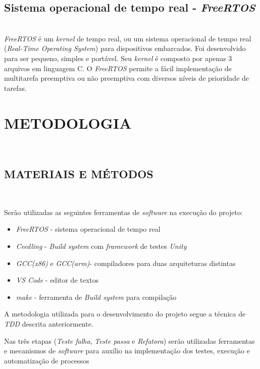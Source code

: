 \documentclass[times, twoside, watermark]{artigo}
\begin{document}
\subsection{Sistema operacional de tempo real - \textit{FreeRTOS}}\hfill\\

\textit{FreeRTOS} é um \textit{kernel} de tempo real, 
ou um sistema operacional de tempo real (\textit{Real-Time Operating System}) 
para dispositivos embarcados. Foi desenvolvido para ser pequeno, simples e portável. 
Seu \textit{kernel} é composto por apenas 3 arquivos em linguagem C. 
O \textit{FreeRTOS} permite a fácil implementação de multitarefa preemptiva 
ou não preemptiva com diversos níveis de prioridade de 
tarefas\cite{zhu2016understanding}.\hfill\\


\section{METODOLOGIA}\hfill\

\subsection{MATERIAIS E MÉTODOS}\hfill\

Serão utilizadas as seguintes ferramentas de \textit{software} na execução do projeto:

\begin{itemize}
\item \textit{FreeRTOS} - sistema operacional de tempo real
\item \textit{Ceedling} - \textit{Build system} com \textit{framework} de testes \textit{Unity}
\item \textit{GCC(x86)} e \textit{GCC(arm)}- compiladores para duas arquiteturas distintas
\item \textit{VS Code} - editor de textos
\item \textit{make} - ferramenta de \textit{Build system} para compilação
\end{itemize}

A metodologia utilizada para o desenvolvimento do projeto segue a técnica de \textit{TDD} descrita anteriormente. 


Nas três etapas (\textit{Teste falha}, \textit{Teste passa}
e \textit{Refatora}) serão utilizadas ferramentas e mecanismos de \textit{software} 
para auxílio na implementação dos testes, execução e automatização de processos \hfill\
\end{document}
